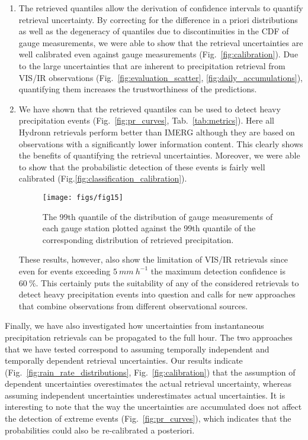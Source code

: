 \documentclass[journal abbreviation, manuscript]{copernicus}
\begin{document}
\begin{enumerate}
\item The retrieved quantiles allow the derivation of confidence intervals to
  quantify retrieval uncertainty. By correcting for the difference in a priori
  distributions as well as the degeneracy of quantiles due to discontinuities in
  the CDF of gauge measurements, we were able to show that the retrieval
  uncertainties are well calibrated even against gauge measurements
  (Fig.~\ref{fig:calibration}). Due to the large uncertainties that are inherent
  to precipitation retrieval from VIS/IR observations
  (Fig.~\ref{fig:evaluation_scatter}, \ref{fig:daily_accumulations}),
  quantifying them increases the trustworthiness of the predictions.
\item We have shown that the retrieved quantiles can be used to detect
  heavy precipitation events (Fig.~\ref{fig:pr_curves},
  Tab.~\ref{tab:metrics}). Here all Hydronn retrievals perform better than IMERG
  although they are based on observations with a significantly lower information
  content. This clearly shows the benefits of quantifying the retrieval
  uncertainties. Moreover, we were able to show that the probabilistic detection
  of these events is fairly well calibrated
  (Fig.\ref{fig:classification_calibration}).

  \begin{figure}[!hbpt]
    \centering
    \texttt{[image: figs/fig15]}
    \caption{
      The 99th quantile of the distribution of gauge measurements of each gauge
      station plotted against the 99th quantile of the corresponding
      distribution of retrieved precipitation.
    }
    \label{fig:quantile_scatter}
  \end{figure}

  These results, however, also show the limitation of VIS/IR retrievals since
  even for events exceeding $5\ \unit{mm\ h^{-1}}$ the maximum detection
  confidence is $60\ \unit{\%}$. This certainly puts the suitability of any of
  the considered retrievals to detect heavy precipitation events into question
  and calls for new approaches that combine observations from different
  observational sources.
\end{enumerate}

Finally, we have also investigated how uncertainties from instantaneous
precipitation retrievals can be propagated to the full hour. The two approaches
that we have tested correspond to assuming temporally independent and temporally
dependent retrieval uncertainties. Our results indicate
(Fig.~\ref{fig:rain_rate_distributions}, Fig.~\ref{fig:calibration}) that the
assumption of dependent uncertainties overestimates the actual retrieval
uncertainty, whereas assuming independent uncertainties underestimates actual
uncertainties. It is interesting to note that the way the uncertainties are
accumulated does not affect the detection of extreme events
(Fig.~\ref{fig:pr_curves}), which indicates that the probabilities could also
be re-calibrated a posteriori.
\end{document}
